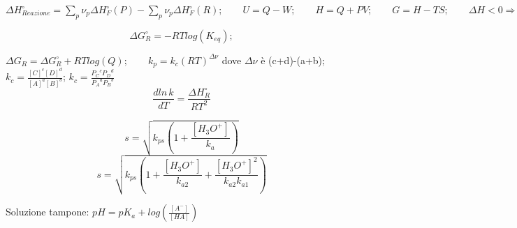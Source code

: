 \documentclass[11pt, twoside, a4paper]{article}
\begin{document}
$\Delta H^{\circ}_{Reazione}=\sum _p \nu_p \Delta H^{\circ}_{F}(P)- \sum _p \nu_p \Delta H^{\circ}_{F}(R); \qquad U=Q-W; \qquad	H=Q+PV; \qquad	G=H-TS; \qquad \Delta H <0 \Rightarrow ESOTERMICA; \qquad \Delta H <0 \Rightarrow ENDOTERMICA; \qquad \Delta H^{\circ}_{elementi}=0; \qquad STD=298K, \; 1M, \; 1bar, \; puri; \qquad \Delta G < 0 \Rightarrow spontanea; \qquad \Delta G > 0 \Rightarrow non \; spontanea; $

$$\Delta G^{\circ}_R = -RTlog(K_{eq});$$

$\Delta G_R = \Delta G^{\circ}_R +RTlog(Q); \qquad k_p= k_c (RT)^{\Delta \nu}$ dove $\Delta \nu$ è (c+d)-(a+b); $k_c=\frac{[C]^c[D]^d}{[A]^a[B]^b}$;    $k_c=\frac{{P_C}^c{P_D}^d}{{P_A}^a{P_B}^b}$
$$\frac{dln \, k}{dT}=\frac{\Delta H^{\circ}_R}{RT^2}$$

$$s=\sqrt{k_{ps} (1+\frac{[H_3O^+]}{k_a})}$$
$$s=\sqrt{k_{ps} (1+\frac{[H_3O^+]}{k_{a2}}+\frac{[H_3O^+]^2}{k_{a2}k_{a1}})}$$

Soluzione tampone: $pH=pK_a + log(\frac{[A^-]}{[HA]})$
\end{document}
